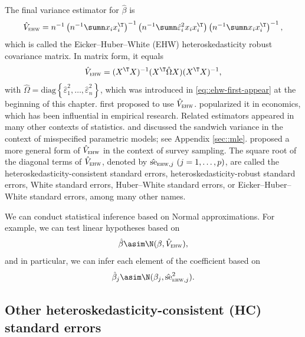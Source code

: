 The final variance estimator for $\hat{\beta}$ is 
\[
\hat{V}_{\textsc{ehw}}=n^{-1}\left(n^{-1}\sumn x_{i}x_{i}^{\T}\right)^{-1}\left(n^{-1}\sumn\hat{\varepsilon}_{i}^{2}x_{i}x_{i}^{\T}\right)\left(n^{-1}\sumn x_{i}x_{i}^{\T}\right)^{-1},
\]
 which is called the Eicker--Huber--White (EHW) heteroskedasticity robust covariance matrix.
In matrix form, it equals 
\[
\hat{V}_{\textsc{ehw}} =(X^{\T}X)^{-1}(X^{\T}\hat{\Omega}X)(X^{\T}X)^{-1},
\]
with $\hat{\Omega}=\text{diag}\left\{ \hat{\varepsilon}_{1}^{2},\ldots,\hat{\varepsilon}_{n}^{2}\right\} $, which was introduced in \eqref{eq::ehw-first-appear} at the beginning of this chapter.  
\citet{eicker1967limit} first proposed to use $\hat{V}_{\textsc{ehw}} $.  \citet{white::1980} popularized it in economics, which has been influential in empirical research.  Related estimators appeared in many other contexts of statistics.
\citet{cox1961tests} and \citet{huber::1967} discussed the sandwich variance in the context of misspecified parametric models; see Appendix \ref{sec::mle}. 
\citet{fuller1975regression} proposed a more general form of $\hat{V}_{\textsc{ehw}} $ in the context of survey sampling. 
The square root of the diagonal terms of $\hat{V}_{\textsc{ehw}} $, denoted by $\hat{\text{se}}_{\textsc{ehw},j}\ (j=1,\ldots,p)$, are called the heteroskedasticity-consistent standard errors, heteroskedasticity-robust standard errors, White standard errors, Huber--White standard errors, or Eicker--Huber--White standard errors, among many other names. 

We can conduct statistical inference based on Normal approximations. For example, we can test linear hypotheses based on
$$
\hat{\beta} \asim \N(\beta,  \hat{V}_{\textsc{ehw}}  ),
$$
and in particular, we can infer each element of the coefficient based on 
$$
\hat{\beta}_j \asim \N(\beta_j, \hat{\text{se}}_{\textsc{ehw}, j}^2 ).
$$  



\subsection{Other heteroskedasticity-consistent (HC) standard errors}
\label{sec::HCs}


